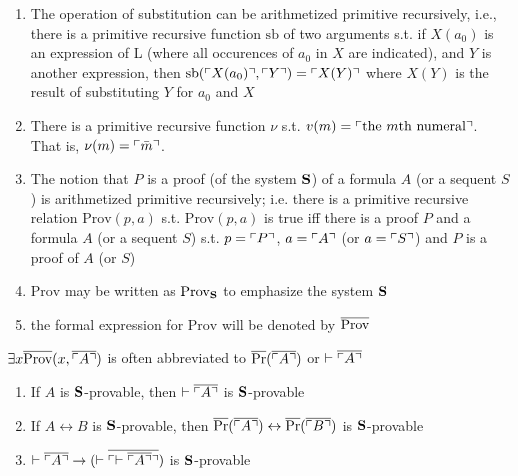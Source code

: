 \documentclass[11pt]{article}
\def \Pr {\text{Pr}}
\def \sb {\text{sb}}
\def \Prov {\text{Prov}}
\begin{document}
\begin{lemma}[]
\label{lemma10.8}
\begin{enumerate}
\item The operation of substitution can be arithmetized primitive recursively, i.e., there is a
primitive recursive function \(\sb\) of two arguments s.t. if \(X(a_0)\) is an expression of L
(where all occurences of \(a_0\) in \(X\) are indicated), and \(Y\) is another expression,
then \(\sb(\ucorner{X(a_0)},\ucorner{Y})=\ucorner{X(Y)}\) where \(X(Y)\) is the result of
substituting \(Y\) for \(a_0\) and \(X\)
\item There is a primitive recursive function \(\nu\) s.t.
\(v(m)=\ulcorner \text{the $m$th numeral} \urcorner\). That is, \(\nu(m)=\ulcorner \bar{m} \urcorner\).
\item The notion that \(P\) is a proof (of the system \(\operatorname{\textbf{S}}\)) of a formula \(A\) (or a
sequent \(S\)) is arithmetized primitive recursively; i.e. there is a primitive recursive
relation \(\Prov(p,a)\) s.t. \(\Prov(p,a)\) is true iff there is a proof \(P\) and a
formula \(A\) (or a sequent \(S\)) s.t. \(p=\ulcorner P \urcorner\), \(a=\ulcorner A \urcorner\)
(or \(a=\ulcorner S \urcorner\)) and \(P\) is a proof of \(A\) (or \(S\))
\item \(\Prov\) may be written as \(\Prov_{\bS}\) to emphasize the system \(\operatorname{\textbf{S}}\)
\item the formal expression for \(\Prov\) will be denoted by \(\ove{\Prov}\)
\end{enumerate}
\end{lemma}

\(\exists x\ove{\Prov}(x,\ove{\ucorner{A}})\) is often abbreviated to \(\ove{\Pr}(\ove{\ucorner{A}})\)
or \(\vdash\overline{\ulcorner A \urcorner}\)

\begin{proposition}[]
\begin{enumerate}
\item If \(A\) is \(\operatorname{\textbf{S}}\)-provable, then \(\vdash\overline{\ulcorner A \urcorner}\) is \(\operatorname{\textbf{S}}\)-provable
\item If \(A\leftrightarrow B\) is \(\operatorname{\textbf{S}}\)-provable,
then \(\ove{\Pr}(\ove{\ucorner{A}})\leftrightarrow\ove{\Pr}(\ove{\ucorner{B}})\) is \(\operatorname{\textbf{S}}\)-provable
\item \(\vdash\overline{\ulcorner A \urcorner}\to(\vdash\overline{\ulcorner \vdash\overline{\ulcorner A \urcorner} \urcorner})\) is \(\operatorname{\textbf{S}}\)-provable
\end{enumerate}
\end{proposition}
\end{document}
